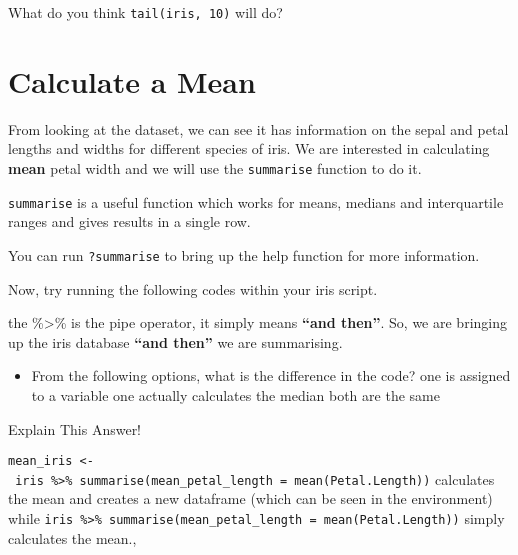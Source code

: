 \documentclass[]{book}
\newenvironment{Shaded}{\begin{snugshade}}{\end{snugshade}}
\newcommand{\DataTypeTok}[1]{\textcolor[rgb]{0.13,0.29,0.53}{#1}}
\newcommand{\KeywordTok}[1]{\textcolor[rgb]{0.13,0.29,0.53}{\textbf{#1}}}
\newcommand{\NormalTok}[1]{#1}
\newcommand{\OperatorTok}[1]{\textcolor[rgb]{0.81,0.36,0.00}{\textbf{#1}}}
\newcommand{\StringTok}[1]{\textcolor[rgb]{0.31,0.60,0.02}{#1}}
\providecommand{\tightlist}{%
  \setlength{\itemsep}{0pt}\setlength{\parskip}{0pt}}
\begin{document}
What do you think \texttt{tail(iris,\ 10)} will do?

\hypertarget{calculate-a-mean}{%
\section{Calculate a Mean}\label{calculate-a-mean}}

From looking at the dataset, we can see it has information on the sepal and petal lengths and widths for different species of iris. We are interested in calculating \textbf{mean} petal width and we will use the \texttt{summarise} function to do it.

\texttt{summarise} is a useful function which works for means, medians and interquartile ranges and gives results in a single row.

You can run \texttt{?summarise} to bring up the help function for more information.

Now, try running the following codes within your iris script.

the \%\textgreater{}\% is the pipe operator, it simply means \textbf{``and then''}. So, we are bringing up the iris database \textbf{``and then''} we are summarising.

\begin{Shaded}
\end{Shaded}

\begin{Shaded}
\end{Shaded}

\begin{itemize}
\tightlist
\item
  From the following options, what is the difference in the code? one is assigned to a variable one actually calculates the median both are the same
\end{itemize}

Explain This Answer!

\texttt{mean\_iris\ \textless{}-\ iris\ \%\textgreater{}\%\ summarise(mean\_petal\_length\ =\ mean(Petal.Length))} calculates the mean and creates a new dataframe (which can be seen in the environment) while \texttt{iris\ \%\textgreater{}\%\ summarise(mean\_petal\_length\ =\ mean(Petal.Length))} simply calculates the mean.,
\end{document}

